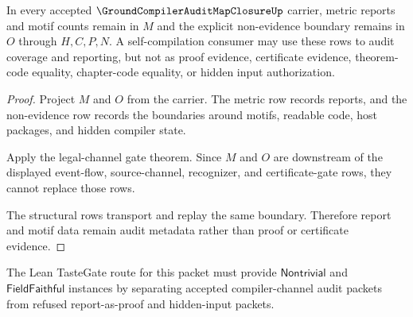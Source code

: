\begin{theorem}
\label{thm:groundcompiler-audit-map-metric-non-evidence-boundary}
In every accepted $\GroundCompilerAuditMapClosureUp$ carrier, metric reports and motif counts remain in $M$ and the explicit non-evidence boundary remains in $O$ through $H,C,P,N$. A self-compilation consumer may use these rows to audit coverage and reporting, but not as proof evidence, certificate evidence, theorem-code equality, chapter-code equality, or hidden input authorization.
\end{theorem}
\begin{proof}
Project $M$ and $O$ from the carrier. The metric row records reports, and the non-evidence row records the boundaries around motifs, readable code, host packages, and hidden compiler state.

Apply the legal-channel gate theorem. Since $M$ and $O$ are downstream of the displayed event-flow, source-channel, recognizer, and certificate-gate rows, they cannot replace those rows.

The structural rows transport and replay the same boundary. Therefore report and motif data remain audit metadata rather than proof or certificate evidence.
\end{proof}



The Lean TasteGate route for this packet must provide $\mathsf{Nontrivial}$ and $\mathsf{FieldFaithful}$ instances by separating accepted compiler-channel audit packets from refused report-as-proof and hidden-input packets.


